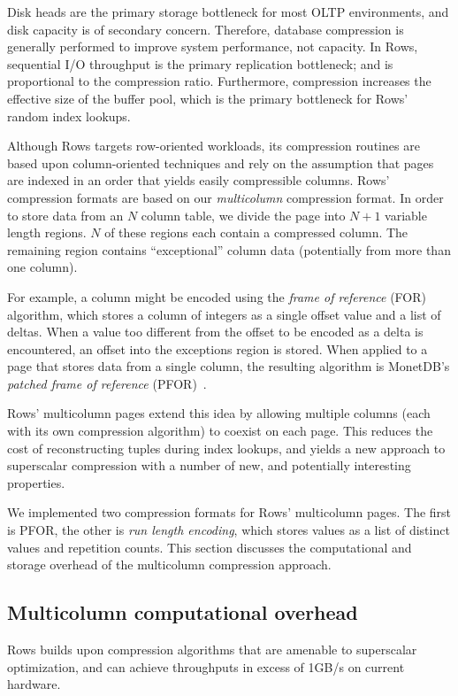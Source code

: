 \documentclass{sig-alternate-sigmod08}
\newcommand{\rows}{Rows\xspace}
\newcommand{\rowss}{Rows'\xspace}
\begin{document}
Disk heads are the primary storage bottleneck for most OLTP
environments, and disk capacity is of secondary concern.  Therefore,
database compression is generally performed to improve system
performance, not capacity.  In \rows, sequential I/O throughput is the
primary replication bottleneck; and is proportional to the compression
ratio.  Furthermore, compression increases the effective size of the buffer
pool, which is the primary bottleneck for \rowss random index lookups.

Although \rows targets row-oriented workloads, its compression
routines are based upon column-oriented techniques and rely on the
assumption that pages are indexed in an order that yields easily
compressible columns.  \rowss compression formats are based on our
{\em multicolumn} compression format.  In order to store data from
an $N$ column table, we divide the page into $N+1$ variable length
regions.  $N$ of these regions each contain a compressed column.  The
remaining region contains ``exceptional'' column data (potentially
from more than one column).

For example, a column might be encoded using the {\em frame of
  reference} (FOR) algorithm, which stores a column of integers as a
single offset value and a list of deltas.  When a value too different
from the offset to be encoded as a delta is encountered, an offset
into the exceptions region is stored.  When applied to a page that
stores data from a single column, the resulting algorithm is MonetDB's
{\em patched frame of reference} (PFOR)~\cite{pfor}.

\rowss multicolumn pages extend this idea by allowing multiple columns
(each with its own compression algorithm) to coexist on each page.
This reduces the cost of reconstructing tuples during index lookups,
and yields a new approach to superscalar compression with a number of
new, and potentially interesting properties.

We implemented two compression formats for \rowss multicolumn pages.
The first is PFOR, the other is {\em run length encoding}, which
stores values as a list of distinct values and repetition counts.
This section discusses the computational and storage overhead of the
multicolumn compression approach.

\subsection{Multicolumn computational overhead}

\rows builds upon compression algorithms that are amenable to
superscalar optimization, and can achieve throughputs in excess of
1GB/s on current hardware.
\end{document}
